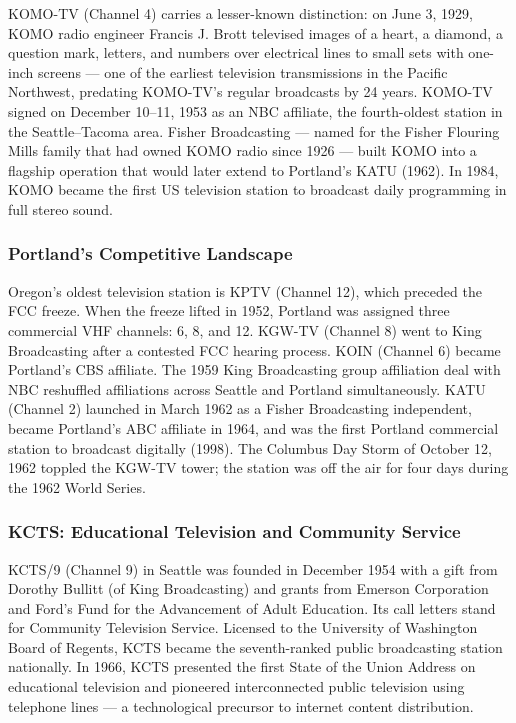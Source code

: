 \documentclass[11pt,letterpaper]{article}
\begin{document}
KOMO-TV (Channel 4) carries a lesser-known distinction: on June 3, 1929, KOMO radio engineer Francis J. Brott televised images of a heart, a diamond, a question mark, letters, and numbers over electrical lines to small sets with one-inch screens --- one of the earliest television transmissions in the Pacific Northwest, predating KOMO-TV's regular broadcasts by 24 years. KOMO-TV signed on December 10--11, 1953 as an NBC affiliate, the fourth-oldest station in the Seattle--Tacoma area. Fisher Broadcasting --- named for the Fisher Flouring Mills family that had owned KOMO radio since 1926 --- built KOMO into a flagship operation that would later extend to Portland's KATU (1962). In 1984, KOMO became the first US television station to broadcast daily programming in full stereo sound.

\subsubsection{Portland's Competitive Landscape}

Oregon's oldest television station is KPTV (Channel 12), which preceded the FCC freeze. When the freeze lifted in 1952, Portland was assigned three commercial VHF channels: 6, 8, and 12. KGW-TV (Channel 8) went to King Broadcasting after a contested FCC hearing process. KOIN (Channel 6) became Portland's CBS affiliate. The 1959 King Broadcasting group affiliation deal with NBC reshuffled affiliations across Seattle and Portland simultaneously. KATU (Channel 2) launched in March 1962 as a Fisher Broadcasting independent, became Portland's ABC affiliate in 1964, and was the first Portland commercial station to broadcast digitally (1998). The Columbus Day Storm of October 12, 1962 toppled the KGW-TV tower; the station was off the air for four days during the 1962 World Series.

\subsubsection{KCTS: Educational Television and Community Service}

KCTS/9 (Channel 9) in Seattle was founded in December 1954 with a gift from Dorothy Bullitt (of King Broadcasting) and grants from Emerson Corporation and Ford's Fund for the Advancement of Adult Education. Its call letters stand for Community Television Service. Licensed to the University of Washington Board of Regents, KCTS became the seventh-ranked public broadcasting station nationally. In 1966, KCTS presented the first State of the Union Address on educational television and pioneered interconnected public television using telephone lines --- a technological precursor to internet content distribution.
\end{document}
